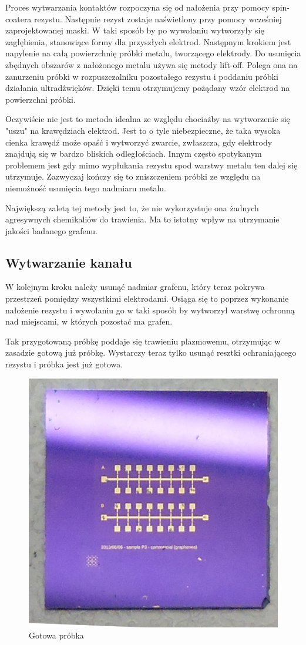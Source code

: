 Proces wytwarzania kontaktów rozpoczyna się od nałożenia przy pomocy spin-coatera rezystu. Następnie rezyst zostaje 
naświetlony przy pomocy wcześniej zaprojektowanej maski. W taki sposób by po wywołaniu wytworzyły się zagłębienia, 
stanowiące formy dla przyszłych elektrod. 
Następnym krokiem jest napylenie na całą powierzchnię próbki metalu, tworzącego elektrody. Do usunięcia zbędnych obszarów
z nałożonego metalu używa się metody lift-off. Polega ona na zanurzeniu próbki w rozpuszczalniku pozostałego rezystu i 
poddaniu próbki działania ultradźwięków.
Dzięki temu otrzymujemy pożądany wzór elektrod na powierzchni próbki.

Oczywiście nie jest to metoda idealna ze względu chociażby na wytworzenie się "uszu" na krawędziach elektrod. Jest to
o tyle niebezpieczne, że taka wysoka cienka krawędź może opaść i wytworzyć zwarcie, zwłaszcza, gdy elektrody znajdują 
się w bardzo bliskich odległościach. Innym często spotykanym problemem jest gdy mimo wypłukania rezystu spod warstwy 
metalu ten dalej się utrzymuje. Zazwyczaj kończy się to zniszczeniem próbki ze względu na niemożność usunięcia tego
nadmiaru metalu.

Największą zaletą tej metody jest to, że nie wykorzystuje ona żadnych agresywnych chemikaliów do trawienia. Ma to istotny
wpływ na utrzymanie jakości badanego grafenu.

\subsection{Wytwarzanie kanału}

W kolejnym kroku należy usunąć nadmiar grafenu, który teraz pokrywa przestrzeń pomiędzy wszystkimi elektrodami. 
Osiąga się to poprzez wykonanie nałożenie rezystu i wywołaniu go w taki sposób by wytworzył warstwę ochronną nad 
miejscami, w których pozostać ma grafen. 

Tak przygotowaną próbkę poddaje się trawieniu plazmowemu, otrzymując w zasadzie gotową już próbkę. Wystarczy teraz 
tylko usunąć resztki ochraniającego rezystu i próbka jest już gotowa.

	\begin{figure}[ht]
	\centering
	\includegraphics[width=.65\textwidth]{./Rozdzial_3/obrazki/Probka}
	\caption{Gotowa próbka}
	\label{fig:GotowaProbka}
	\end{figure}

